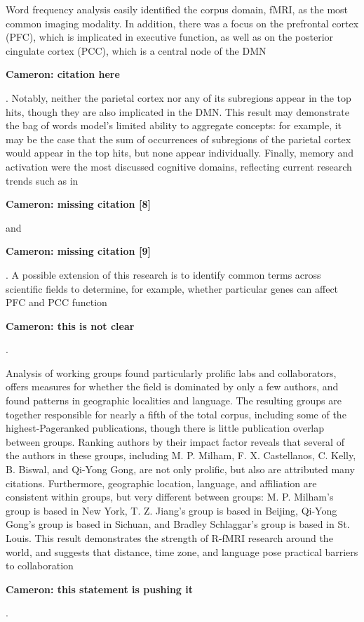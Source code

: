 \documentclass[5p]{elsarticle}
\newcommand\MyCBox[1]{%
  \colorbox{yellow!60}{\begin{varwidth}{\dimexpr\linewidth-2\fboxsep}#1\end{varwidth}}}
\newcommand{\COMMENTCC}[1]{\MyCBox{\textcolor{cc_commentcolor}{\textbf{Cameron:
#1}}}}
\begin{document}
Word frequency analysis easily identified the corpus domain, fMRI, as the
most common imaging modality. In addition, there was a focus on the
prefrontal cortex (PFC), which is implicated in executive function, as
well as on the posterior cingulate cortex (PCC), which is a central node
of the DMN \COMMENTCC{citation here}.  Notably, neither the parietal
cortex nor any of its subregions appear in the top hits, though they are
also implicated in the DMN. This result may demonstrate the bag of words
model’s limited ability to aggregate concepts: for example, it may be the
case that the sum of occurrences of subregions of the parietal cortex
would appear in the top hits, but none appear individually. Finally,
memory and activation were the most discussed cognitive domains,
reflecting current research trends such as in \COMMENTCC{missing citation
[8]} and \COMMENTCC{missing citation [9]}. A possible extension of this
research is to identify common terms across scientific fields to
determine, for example, whether particular genes can affect PFC and PCC
function \COMMENTCC{this is not clear}.

Analysis of working groups found particularly prolific labs and
collaborators, offers measures for whether the field is dominated by only
a few authors, and found patterns in geographic localities and language.
The resulting groups are together responsible for nearly a fifth of the
total corpus, including some of the highest-Pageranked publications,
though there is little publication overlap between groups. Ranking authors
by their impact factor reveals that several of the authors in these
groups, including M. P. Milham, F. X. Castellanos, C.  Kelly, B. Biswal,
and Qi-Yong Gong, are not only prolific, but also are attributed many
citations. Furthermore, geographic location, language, and affiliation are
consistent within groups, but very different between groups: M. P.
Milham’s group is based in New York, T. Z. Jiang’s group is based in
Beijing, Qi-Yong Gong’s group is based in Sichuan, and Bradley Schlaggar’s
group is based in St. Louis.  This result demonstrates the strength of
R-fMRI research around the world, and suggests that distance, time zone,
and language pose practical barriers to collaboration \COMMENTCC{this
statement is pushing it}.
\end{document}
